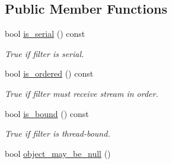 \subsection*{Public Member Functions}
\begin{DoxyCompactItemize}
\item 
\hypertarget{classtbb_1_1filter_a6efb96f4660820fc6d47f9f480c07d35}{}bool \hyperlink{classtbb_1_1filter_a6efb96f4660820fc6d47f9f480c07d35}{is\+\_\+serial} () const \label{classtbb_1_1filter_a6efb96f4660820fc6d47f9f480c07d35}

\begin{DoxyCompactList}\small\item\em True if filter is serial. \end{DoxyCompactList}\item 
\hypertarget{classtbb_1_1filter_ace53ff32ffb066e52c44f439c9150a05}{}bool \hyperlink{classtbb_1_1filter_ace53ff32ffb066e52c44f439c9150a05}{is\+\_\+ordered} () const \label{classtbb_1_1filter_ace53ff32ffb066e52c44f439c9150a05}

\begin{DoxyCompactList}\small\item\em True if filter must receive stream in order. \end{DoxyCompactList}\item 
\hypertarget{classtbb_1_1filter_aa3a4a81d3130c3749ada365387023623}{}bool \hyperlink{classtbb_1_1filter_aa3a4a81d3130c3749ada365387023623}{is\+\_\+bound} () const \label{classtbb_1_1filter_aa3a4a81d3130c3749ada365387023623}

\begin{DoxyCompactList}\small\item\em True if filter is thread-\/bound. \end{DoxyCompactList}\item 
\hypertarget{classtbb_1_1filter_aeb5fbff6b01a85e0c74c8976b6f761de}{}bool \hyperlink{classtbb_1_1filter_aeb5fbff6b01a85e0c74c8976b6f761de}{object\+\_\+may\+\_\+be\+\_\+null} ()\label{classtbb_1_1filter_aeb5fbff6b01a85e0c74c8976b6f761de}


\end{DoxyCompactItemize}
